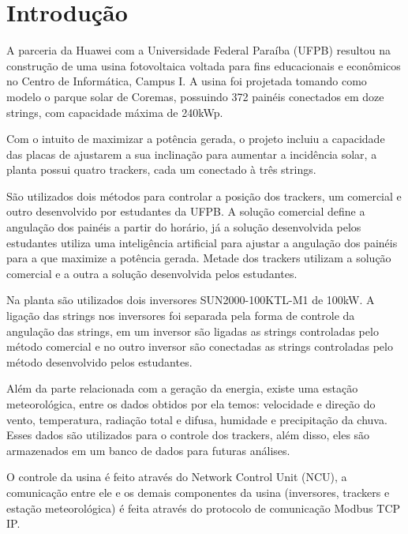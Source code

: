 \documentclass[a4paper,12pt]{article}
\begin{document}
\newpage

\listoftables
\clearpage
\tableofcontents
\newpage
{}
\pagebreak

\section{Introdução}

A parceria da Huawei com a Universidade Federal Paraíba (UFPB) resultou na construção de uma usina fotovoltaica voltada para fins educacionais e econômicos no Centro de Informática, Campus I. A usina foi projetada tomando como modelo o parque solar de Coremas, possuindo 372 painéis conectados em doze strings, com capacidade máxima de 240kWp.

Com o intuito de maximizar a potência gerada, o projeto incluiu a capacidade das placas de ajustarem a sua inclinação para aumentar a incidência solar, a planta possui quatro trackers, cada um conectado à três strings.

São utilizados dois métodos para controlar a posição dos trackers, um comercial e outro desenvolvido por estudantes da UFPB. A solução comercial define a angulação dos painéis a partir do horário, já a solução desenvolvida pelos estudantes utiliza uma inteligência artificial para ajustar a angulação dos painéis para a que maximize a potência gerada. Metade dos trackers utilizam a solução comercial e a outra a solução desenvolvida pelos estudantes.

Na planta são utilizados dois inversores SUN2000-100KTL-M1 de 100kW.  A ligação das strings nos inversores foi separada pela forma de controle da angulação das strings, em um inversor são ligadas as strings controladas pelo método comercial e no outro inversor são conectadas as strings controladas pelo método desenvolvido pelos estudantes.

Além da parte relacionada com a geração da energia, existe uma estação meteorológica, entre os dados obtidos por ela temos: velocidade e direção do vento, temperatura, radiação total e difusa, humidade e precipitação da chuva. Esses dados são utilizados para o controle dos trackers, além disso, eles são armazenados em um banco de dados para futuras análises.

O controle da usina é feito através do Network Control Unit (NCU), a comunicação entre ele e os demais componentes da usina (inversores, trackers e estação meteorológica) é feita através do protocolo de comunicação Modbus TCP IP.
\end{document}
